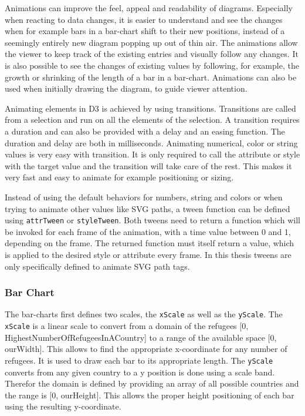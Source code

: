Animations can improve the feel, appeal and readability of diagrams. Especially when reacting to data changes, it is easier to understand and see the changes when for example bars in a bar-chart shift to their new positions, instead of a seemingly entirely new diagram popping up out of thin air. The animations allow the viewer to keep track of the existing entries and visually follow any changes. It is also possible to see the changes of existing values by following, for example, the growth or shrinking of the length of a bar in a bar-chart. Animations can also be used when initially drawing the diagram, to guide viewer attention.

Animating elements in D3 is achieved by using transitions. Transitions are called from a selection and run on all the elements of the selection. A transition requires a duration and can also be provided with a delay and an easing function. The duration and delay are both in milliseconds. Animating numerical, color or string values is very easy with transition. It is only required to call the attribute or style with the target value and the transition will take care of the rest. This makes it very fast and easy to animate for example positioning or sizing.

Instead of using the default behaviors for numbers, string and colors or when trying to animate other values like SVG paths, a tween function can be defined using \verb|attrTween| or \verb|styleTween|. Both tweens need to return a function which will be invoked for each frame of the animation, with a time value between 0 and 1, depending on the frame. The returned function must itself return a value, which is applied to the desired style or attribute every frame. In this thesis tweens are only specifically defined to animate SVG path tags.


\subsubsection{Bar Chart}

The bar-charts first defines two scales, the \texttt{xScale} as well as the \texttt{yScale}. The \texttt{xScale} is a linear scale to convert from a domain of the refugees [0, HighestNumberOfRefugeesInACountry] to a range of the available space [0, ourWidth]. This allows to find the appropriate x-coordinate for any number of refugees. It is used to draw each bar to its appropriate length. The \texttt{yScale} converts from any given country to a y position is done using a scale band. Therefor the domain is defined by providing an array of all possible countries and the range is [0, ourHeight]. This allows the proper height positioning of each bar using the resulting y-coordinate.

